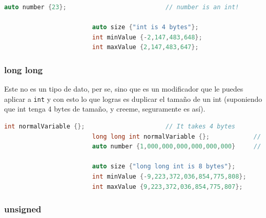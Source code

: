 \documentclass[12pt, fleqn]{report}                             %
\theoremstyle{break}                                            %
\begin{document}
                    \begin{lstlisting}[language=C++, gobble=20]
                        auto number {23};                           // number is an int!

                        auto size {"int is 4 bytes"};
                        int minValue {-2,147,483,648};
                        int maxValue {2,147,483,647};
                    \end{lstlisting}

                \subsubsection{long long}

                    Este no es un tipo de dato, per se, sino que es un modificador que le puedes aplicar
                    a \texttt{int} y con esto lo que logras es duplicar el tamaño de un int (suponiendo
                    que int tenga 4 bytes de tamaño, y creeme, seguramente es así).
                    
                    \begin{lstlisting}[language=C++, gobble=20]
                        int normalVariable {};                      // It takes 4 bytes     
                        long long int normalVariable {};            // It takes 8 bytes 
                        auto number {1,000,000,000,000,000,000}     // number is long long  

                        auto size {"long long int is 8 bytes"};
                        int minValue {-9,223,372,036,854,775,808};
                        int maxValue {9,223,372,036,854,775,807};
                    \end{lstlisting}


                \subsubsection{unsigned}
\end{document}
